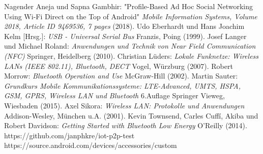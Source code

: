 \documentclass[12pt,a4paper]{article}
\begin{document}
    \begin{thebibliography}{10}
        Nagender Aneja und Sapna Gambhir: "Profile-Based Ad Hoc Social Networking Using Wi-Fi Direct on the Top of Android" {\it Mobile Information Systems, Volume 2018, Article ID 9469536, 7 pages} (2018).
         Udo Eberhardt und Hans Joachim Kelm [Hrsg.]: {\it USB - Universal Serial Bus} Franzis, Poing (1999).
        Josef Langer und Michael Roland: {\it Anwendungen und Technik von Near Field Communication (NFC)} Springer, Heidelberg (2010).
        Christian Lüders: {\it Lokale Funknetze: Wireless LANs (IEEE 802.11), Bluetooth, DECT} Vogel, Würzburg (2007).
        Robert Morrow: {\it Bluetooth Operation and Use} McGraw-Hill (2002).
        Martin Sauter: {\it Grundkurs Mobile Kommunikationssysteme: LTE-Advanced, UMTS, HSPA, GSM, GPRS, Wireless LAN und Bluetooth} 6.Auflage Springer Vieweg, Wiesbaden (2015).
        Axel Sikora: {\it Wireless LAN: Protokolle und Anwendungen} Addison-Wesley, München u.A. (2001).
		 Kevin Townsend, Carles Cuffí, Akiba und Robert Davidson: {\it Getting Started with Bluetooth Low Energy} O'Reilly (2014).
        https://github.com/janphkre/iot-p2p-test
        https://source.android.com/devices/accessories/custom
    \end{thebibliography}
\end{document}
